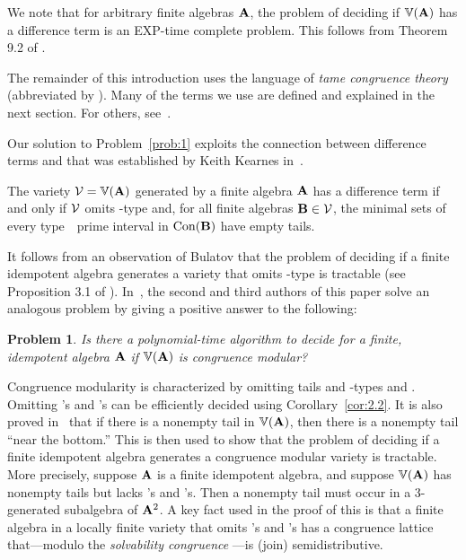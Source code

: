 \documentclass{ws-ijac}
\newtheorem{prob}{Problem}
\begin{document}
We note that for arbitrary finite algebras $\mathbf{A}$, the problem of deciding if $\operatorname{\mathbb{V}}(\mathbf{A})$ has a difference term is an EXP-time complete problem.  This follows from Theorem 9.2 of \cite{Freese:2009}.

The remainder of this introduction uses the language of \emph{tame congruence theory} (abbreviated by \tct).  Many of the terms we use are defined and explained
in the next section.  For others, see~\cite{HM:1988}.

Our solution to Problem~\ref{prob:1} exploits the connection
between difference terms and \tct that was established
by Keith Kearnes in~\cite{MR1358491}.

\begin{theorem}
\label{thm:KearnesThm}
The variety $\mathcal{V} = \operatorname{\mathbb{V}}(\mathbf{A})$ generated by a
finite algebra $\mathbf{A}$ has a difference term  if and only if
$\mathcal{V}$ omits \tct-type \utyp and, for all finite algebras
$\mathbf{B} \in \mathcal{V}$,
the minimal sets of every type~\atyp\ prime interval in
$\operatorname{Con}(\mathbf{B})$ have empty tails.
\end{theorem}



It follows from an observation of Bulatov that the problem of deciding if a finite idempotent algebra generates a variety that omits \tct-type \utyp is tractable (see Proposition 3.1 of \cite{MR2504025}).
In~\cite{Freese:2009}, the second and third authors of this paper solve an
analogous problem by giving a positive answer to the following:
\begin{prob}
  \label{prob:2}
  Is there a polynomial-time algorithm to decide for a finite,
  idempotent algebra $\mathbf{A}$ if $\operatorname{\mathbb{V}}(\mathbf{A})$ is congruence modular?
\end{prob}

Congruence modularity is characterized by omitting tails and
\tct-types \utyp and \styp.
Omitting \utyp's and \styp's can be efficiently decided using Corollary~\ref{cor:2.2}. %
It is also proved in~\cite{Freese:2009} that
if there is a
nonempty
tail in $\operatorname{\mathbb{V}}(\mathbf{A})$, then there is a
nonempty
tail ``near the bottom.'' This is then used to show that the problem of deciding if a finite idempotent algebra generates a congruence modular variety is tractable.
More precisely, suppose $\mathbf{A}$ is a finite idempotent algebra, and suppose
$\operatorname{\mathbb{V}}(\mathbf{A})$ has nonempty tails but lacks \utyp's and \styp's.
Then a nonempty tail must occur in a 3-generated subalgebra of $\mathbf{A}^2$.
A key fact used in the proof of this is that a finite algebra in a locally finite variety that omits
\utyp's and \styp's has a congruence lattice that---modulo
the {\it solvability congruence} ---is (join) semidistributive.
\end{document}
